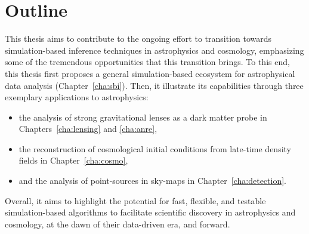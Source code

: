 \section{Outline}
This thesis aims to contribute to the ongoing effort to transition towards simulation-based inference techniques in astrophysics and cosmology, emphasizing some of the tremendous opportunities that this transition brings. To this end, this thesis first proposes a general simulation-based ecosystem for astrophysical data analysis (Chapter~\ref{cha:sbi}). Then, it illustrate its capabilities through three exemplary applications to astrophysics: 
\begin{itemize}[leftmargin=1cm]
	\item the analysis of strong gravitational lenses as a dark matter probe in Chapters~\ref{cha:lensing} and \ref{cha:anre}, 
	\item the reconstruction of cosmological initial conditions from late-time density fields in Chapter~\ref{cha:cosmo}, 
	\item and the analysis of point-sources in sky-maps in Chapter~\ref{cha:detection}. 
\end{itemize}
Overall, it aims to highlight the potential for fast, flexible, and testable simulation-based algorithms to facilitate scientific discovery in astrophysics and cosmology, at the dawn of their data-driven era, and forward.




